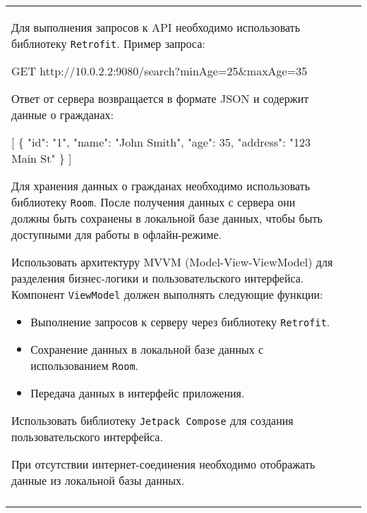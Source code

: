 \documentclass[a4paper]{article}
\begin{document}
\begin{tabular}{!{\vrule width 2pt}p{5cm}|p{6cm}|p{4cm}!{\vrule width 2pt}}
{\begin{minipage}{16cm}
\begin{enumerate}

Для выполнения запросов к API необходимо использовать библиотеку \texttt{Retrofit}. Пример запроса:


GET http://10.0.2.2:9080/search?minAge=25\&maxAge=35


Ответ от сервера возвращается в формате JSON и содержит данные о гражданах:


[
  \{
    "id": "1",
    "name": "John Smith",
    "age": 35,
    "address": "123 Main St"
  \}
]


Для хранения данных о гражданах необходимо использовать библиотеку \texttt{Room}. После получения данных с сервера они должны быть сохранены в локальной базе данных, чтобы быть доступными для работы в офлайн-режиме.

Использовать архитектуру MVVM (Model-View-ViewModel) для разделения бизнес-логики и пользовательского интерфейса. Компонент \texttt{ViewModel} должен выполнять следующие функции:
\begin{itemize}
    \item Выполнение запросов к серверу через библиотеку \texttt{Retrofit}.
    \item Сохранение данных в локальной базе данных с использованием \texttt{Room}.
    \item Передача данных в интерфейс приложения.
\end{itemize}

Использовать библиотеку \texttt{Jetpack Compose} для создания пользовательского интерфейса.

При отсутствии интернет-соединения необходимо отображать данные из локальной базы данных. 
\end{enumerate}

\vspace{0.2cm}
    
\end{minipage}
}
\\
\end{tabular}
\end{document}
